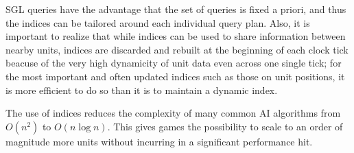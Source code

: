 SGL queries have the advantage that the set of queries is fixed a priori, and thus the indices can be tailored around each individual query plan. Also, it is important to realize that while indices can be used to share information between nearby units, indices are discarded and rebuilt at the beginning of each clock tick beacuse of the very high dynamicity of unit data even across one single tick; for the most important and often updated indices such as those on unit positions, it is more efficient to do so than it is to maintain a dynamic index.

The use of indices reduces the complexity of many common AI algorithms from $O(n^2)$ to $O(n \log n)$. This gives games the possibility to scale to an order of magnitude more units without incurring in a significant performance hit.